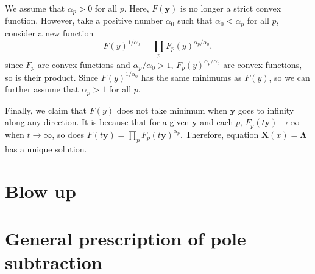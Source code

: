 \documentclass[12pt]{article}
\theoremstyle{definition}
\theoremstyle{plain}
\begin{document}
We assume that $\alpha_p>0$ for all $p$. Here, $F(\mathbf y)$ is no longer a strict convex function. However, take a positive number $\alpha_0$ such that $\alpha_0< \alpha_p$ for all $p$, consider a new function
\[
	F(y)^{1/\alpha_0}=\prod_p F_p(y)^{\alpha_p/\alpha_0},
\]
since $F_p$ are convex functions and $\alpha_p/\alpha_0>1$, $F_p(y)^{\alpha_p/\alpha_0}$ are convex functions, so is their product. Since $F(y)^{1/\alpha_0}$ has the same minimums as $F(y)$, so we can further assume that $\alpha_p>1$ for all $p$.

Finally, we claim that $F(y)$ does not take minimum when $\mathbf{y}$ goes to infinity along any direction. It is because that for a given $\mathbf{y}$ and each $p$, $F_p(t\mathbf{y})\to \infty$ when $t\to \infty$, so does $F(t\mathbf{y})=\prod_p F_p(t\mathbf{y})^{\alpha_p}$. Therefore, equation $\mathbf{X}(x)=\mathbf{\Lambda}$ has a unique solution.

\section{Blow up}

\section{General prescription of pole subtraction}
\end{document}
